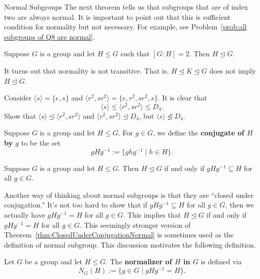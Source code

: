 \begin{section}{Normal Subgroups}
The next theorem tells us that subgroups that are of index two are always normal. It is important to point out that this is sufficient condition for normality but not necessary. For example, see Problem~\ref{prob:all subgroups of Q8 are normal}.

\begin{theorem}\label{thm:index2}
Suppose $G$ is a group and let $H\leq G$ such that $[G:H]=2$.  Then $H\trianglelefteq G$.
\end{theorem}

It turns out that normality is not transitive. That is, $H\trianglelefteq K \trianglelefteq G$ does not imply $H\trianglelefteq G$.

\begin{problem}
Consider $\langle s\rangle=\{e,s\}$ and $\langle r^2,sr^2\rangle =\{e,r^2,sr^2,s\}$. It is clear that
\[
\langle s\rangle\leq \langle r^2,sr^2\rangle\leq D_4.
\]
Show that $\langle s\rangle\trianglelefteq \langle r^2,sr^2\rangle$ and $\langle r^2,sr^2\rangle\trianglelefteq D_4$, but $\langle s\rangle\not\trianglelefteq D_4$.
\end{problem}

\begin{definition}
Suppose $G$ is a group and let $H\leq G$. For $g\in G$, we define the \textbf{conjugate of $H$ by $g$} to be the set
\[
gHg^{-1}:=\{ghg^{-1}\mid h\in H\}.
\]
\end{definition}

\begin{theorem}\label{thm:ClosedUnderConjugationNormal}
Suppose $G$ is a group and let $H\leq G$.  Then $H\trianglelefteq G$ if and only if $gHg^{-1}\subseteq H$ for all $g\in G$.
\end{theorem}

Another way of thinking about normal subgroups is that they are ``closed under conjugation." It's not too hard to show that if $gHg^{-1}\subseteq H$ for all $g\in G$, then we actually have $gHg^{-1}=H$ for all $g\in G$.  This implies that $H\trianglelefteq G$ if and only if $gHg^{-1}=H$ for all $g\in G$. This seemingly stronger version of Theorem~\ref{thm:ClosedUnderConjugationNormal} is sometimes used as the definition of normal subgroup. This discussion motivates the following definition.

\begin{definition}
Let $G$ be a group and let $H\leq G$.  The \textbf{normalizer of $H$ in $G$} is defined via
\[
N_G(H):=\{g\in G\mid gHg^{-1}=H\}.
\]
\end{definition}


\end{section}
